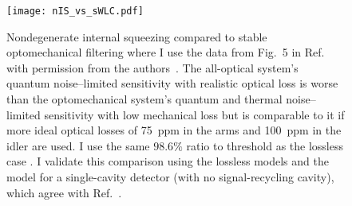 \begin{figure}
	\centering
	\texttt{[image: nIS\_vs\_sWLC.pdf]}
	\caption{ Nondegenerate internal squeezing compared to stable optomechanical filtering where I use the data from Fig.~5 in Ref.~\cite{liBroadbandSensitivityImprovement2020} with permission from the authors~\cite{xiangLiPersonalCommunication}. The all-optical system's quantum noise--limited sensitivity with realistic optical loss is worse than the optomechanical system's quantum and thermal noise--limited sensitivity with low mechanical loss but is comparable to it if more ideal optical losses of 75~ppm in the arms and 100~ppm in the idler are used. I use the same $98.6\%$ ratio to threshold as the lossless case . I validate this comparison using the lossless models and the model for a single-cavity detector (with no signal-recycling cavity), which agree with Ref.~\cite{liBroadbandSensitivityImprovement2020}.}
	\label{fig:nIS_vs_sWLC}
\end{figure}

